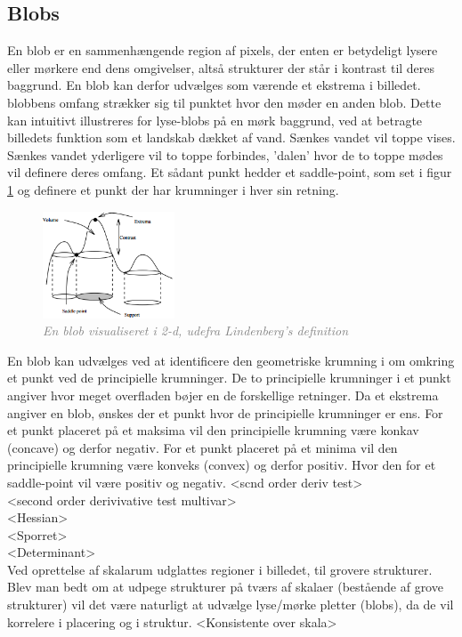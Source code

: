 \subsection{Blobs}
En blob er en sammenhængende region af pixels, der enten er betydeligt lysere eller mørkere end dens omgivelser, altså strukturer der står i kontrast til deres baggrund. En blob kan derfor udvælges som værende et ekstrema i billedet. blobbens omfang strækker sig til punktet hvor den møder en anden blob. Dette kan intuitivt illustreres for lyse-blobs på en mørk baggrund, ved at betragte billedets funktion som et landskab dækket af vand. Sænkes vandet vil toppe vises. Sænkes vandet yderligere vil to toppe forbindes, 'dalen' hvor de to toppe mødes vil definere deres omfang. Et sådant punkt hedder et saddle-point, som set i figur \ref{fig:lindblob} og definere et punkt der har krumninger i hver sin retning.
\begin{figure}[H]
    \centering
    \includegraphics[width=0.35\textwidth]{fig/11.png}
    \vspace{-0.5em}   
    \begin{center}
    \caption{\textcolor{gray}{\footnotesize \textit{
    En blob visualiseret i 2-d, udefra Lindenberg's definition \cite{blob}}}}
    \label{fig:lindblob}
     \end{center}
  \end{figure}
       \vspace{-2.7em}
\noindent
En blob kan udvælges ved at identificere den geometriske krumning i om omkring et punkt ved de principielle krumninger. De to principielle krumninger i et punkt angiver hvor meget overfladen bøjer en de forskellige retninger.
Da et ekstrema angiver en blob, ønskes der et punkt hvor de principielle krumninger er ens. For et punkt placeret på et maksima vil den principielle krumning være konkav (concave) og derfor negativ. For et punkt placeret på et minima vil den principielle krumning være konveks (convex) og derfor positiv. Hvor den for et saddle-point vil være positiv og negativ.
<scnd order deriv test> \\
<second order derivivative test multivar> \\
<Hessian>\\
<Sporret>\\
<Determinant>\\
Ved oprettelse af skalarum udglattes regioner i billedet, til grovere strukturer. Blev man bedt om at udpege strukturer på tværs af skalaer (bestående af grove strukturer) vil det være naturligt at udvælge lyse/mørke pletter (blobs), da de vil korrelere i placering og i struktur. 
<Konsistente over skala>

